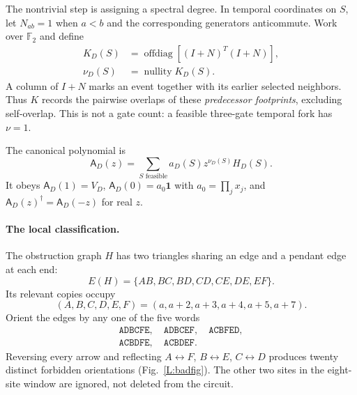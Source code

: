 \documentclass[10pt,letterpaper]{article}
\newcommand{\FF}{\mathbb F_2}
\newcommand{\one}{\mathbf 1}
\newcommand{\nullity}{\operatorname{nullity}}
\newcommand{\offdiag}{\operatorname{offdiag}}
\newcommand{\cA}{\mathsf A}
\begin{document}
The nontrivial step is assigning a spectral degree. In temporal coordinates on $S$, let $N_{ab}=1$ when $a<b$ and the corresponding generators anticommute. Work over $\FF$ and define
\begin{equation}\label{L:grade}
 \begin{aligned}
 K_D(S)&=\offdiag[(I+N)^T(I+N)],\\
 \nu_D(S)&=\nullity K_D(S).
 \end{aligned}
\end{equation}
A column of $I+N$ marks an event together with its earlier selected neighbors. Thus $K$ records the pairwise overlaps of these \emph{predecessor footprints}, excluding self-overlap. This is not a gate count: a feasible three-gate temporal fork has $\nu=1$.

The canonical polynomial is
\begin{equation}\label{L:transfer}
 \boxed{\cA_D(z)=\sum_{S\text{ feasible}}a_D(S)z^{\nu_D(S)}H_D(S).}
\end{equation}
It obeys $\cA_D(1)=V_D$, $\cA_D(0)=a_0\one$ with $a_0=\prod_jx_j$, and $\cA_D(z)^\dagger=\cA_D(-z)$ for real $z$.

\paragraph{The local classification.}
The obstruction graph $H$ has two triangles sharing an edge and a pendant edge at each end:
\begin{equation}\label{L:edges}
 E(H)=\{AB,BC,BD,CD,CE,DE,EF\}.
\end{equation}
Its relevant copies occupy
\begin{equation}\label{L:sites}
 (A,B,C,D,E,F)=(a,a+2,a+3,a+4,a+5,a+7).
\end{equation}
Orient the edges by any one of the five words
\begin{equation}\label{L:reps}
 \begin{gathered}
 \texttt{ADBCFE},\quad\texttt{ADBCEF},\quad\texttt{ACBFED},\\
 \texttt{ACBDFE},\quad\texttt{ACBDEF}.
 \end{gathered}
\end{equation}
Reversing every arrow and reflecting $A\leftrightarrow F$, $B\leftrightarrow E$, $C\leftrightarrow D$ produces twenty distinct forbidden orientations (Fig.~\ref{L:badfig}). The other two sites in the eight-site window are ignored, not deleted from the circuit.
\end{document}
